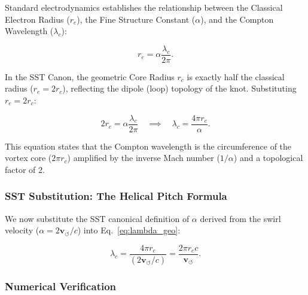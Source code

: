         Standard electrodynamics establishes the relationship between the
        Classical Electron Radius ($r_e$), the Fine Structure Constant ($\alpha$),
        and the Compton Wavelength ($\lambda_c$):

        \begin{equation}
            r_e = \alpha \frac{\lambda_c}{2\pi}.
        \end{equation}

        In the SST Canon, the geometric Core Radius $r_c$ is exactly half the
        classical radius ($r_e = 2r_c$), reflecting the dipole (loop) topology
        of the knot. Substituting $r_e = 2r_c$:

        \begin{equation}
            2r_c = \alpha \frac{\lambda_c}{2\pi} \quad \implies \quad
            \lambda_c = \frac{4\pi r_c}{\alpha}.
            \label{eq:lambda_geo}
        \end{equation}

        This equation states that the Compton wavelength is the circumference of
        the vortex core ($2\pi r_c$) amplified by the inverse Mach number ($1/\alpha$)
        and a topological factor of 2.

    \subsubsection*{SST Substitution: The Helical Pitch Formula}

        We now substitute the SST canonical definition of $\alpha$ derived from
        the swirl velocity ($\alpha = 2 \mathbf{v}_{\!\boldsymbol{\circlearrowleft}} / c$) into Eq.~\eqref{eq:lambda_geo}:

        \begin{equation}
            \lambda_c = \frac{4\pi r_c}{(2 \mathbf{v}_{\!\boldsymbol{\circlearrowleft}} / c)}
            = \frac{2\pi r_c c}{\mathbf{v}_{\!\boldsymbol{\circlearrowleft}}}.
            \label{eq:SST_Compton}
        \end{equation}

    \subsubsection*{Numerical Verification}

